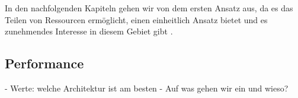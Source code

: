 In den nachfolgenden Kapiteln gehen wir von dem ersten Ansatz aus, da es das Teilen von Ressourcen ermöglicht, einen einheitlich Ansatz bietet
und es zunehmendes Interesse in diesem Gebiet gibt \cite{Yu.2014, Hara.2017}.

\subsection{Performance}
- Werte: welche Architektur ist am besten
- Auf was gehen wir ein und wieso?